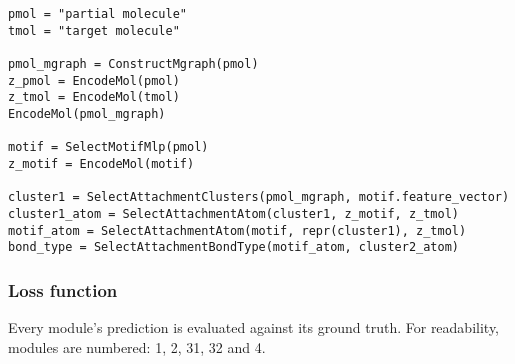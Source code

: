 \documentclass{article}
\begin{document}
\begin{lstlisting}
pmol = "partial molecule"
tmol = "target molecule"

pmol_mgraph = ConstructMgraph(pmol)
z_pmol = EncodeMol(pmol)
z_tmol = EncodeMol(tmol)
EncodeMol(pmol_mgraph)

motif = SelectMotifMlp(pmol)
z_motif = EncodeMol(motif)

cluster1 = SelectAttachmentClusters(pmol_mgraph, motif.feature_vector)
cluster1_atom = SelectAttachmentAtom(cluster1, z_motif, z_tmol)
motif_atom = SelectAttachmentAtom(motif, repr(cluster1), z_tmol)
bond_type = SelectAttachmentBondType(motif_atom, cluster2_atom)
\end{lstlisting}


\subsubsection{Loss function}

Every module's prediction is evaluated against its ground truth.
For readability, modules are numbered: 1, 2, 31, 32 and 4.
\end{document}
